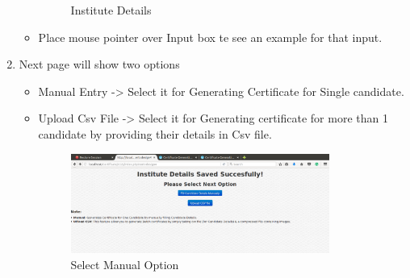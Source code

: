 \begin{enumerate}
\begin{itemize}
\begin{figure}[!ht]
\caption{Institute Details}
\hspace{-1.5em}
\end{figure}
\item Place mouse pointer over Input box te see an example for that input.
\end{itemize}
\item Next page will show two options
\begin{itemize}
\item Manual Entry    -> Select it for Generating Certificate for Single candidate.
\item Upload Csv File -> Select it for Generating certificate for more than 1 candidate by providing their details in Csv file.
\begin{figure}[!ht]
\centering
\includegraphics[width=0.85\textwidth]{images/cgs/cgs3.png}                  
\caption{Select Manual Option}
\hspace{-1.5em}
\end{figure}
\end{itemize}
\end{enumerate}

